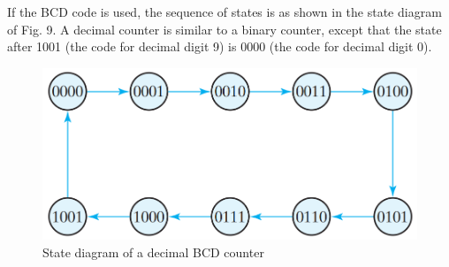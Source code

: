 \begin{multicols}{2}
If the BCD code is used, the sequence of states is as shown in the state diagram of Fig. 9. A decimal counter is similar to a binary counter, except that the state after 1001 (the code for decimal digit 9) is 0000 (the code for decimal digit 0).

\begin{figure}[H]
  \centering
  \includegraphics[width=\linewidth]{img/fig-6.9.png}
  \caption{State diagram of a decimal BCD counter}
  \label{fig:6.9}
\end{figure}

\vspace*{\fill}
\columnbreak


\end{multicols}
